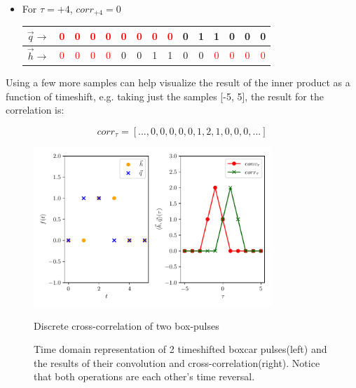 \begin{itemize}
\begin{center}
\end{center}


\item For $\tau = +4$, $corr_{+4}=0$

\begin{center}

\begin{tabular}{c|c|c|c|c| c|c|c|c|c|c |c|c|c|c|}

$\vec{q} \rightarrow$&\textcolor{red}{0}&\textcolor{red}{0}&\textcolor{red}{0}&\textcolor{red}{0}&\textcolor{red}{0}&\textcolor{red}{0}&\textcolor{red}{0}&\textcolor{red}{0}&0&1&1&0&0&0\\

\hline
$\vec{h} \rightarrow$&\textcolor{red}{0}&\textcolor{red}{0}&\textcolor{red}{0}&\textcolor{red}{0}&0&0&1&1&0&0&\textcolor{red}{0}&\textcolor{red}{0}&\textcolor{red}{0}&\textcolor{red}{0}
\end{tabular}

\end{center}

\end{itemize}

\vspace{1cm}

Using a few more samples can help visualize the result of the inner product as a function of timeshift, e.g. taking just the samples [-5, 5], the result for the correlation is:

$$corr_\tau = [...,0,0,0,0,0,1,2,1,0,0,0 ,...]$$



\begin{figure}[hbt!]
\begin{center}
\includegraphics[width=0.8\textwidth, angle=0]{images/Data_analysis/sig_proc/corr.pdf}
\captionsetup{width=0.8\textwidth}
\caption{Discrete cross-correlation of two box-pulses}
\caption*{Time domain representation of 2 timeshifted boxcar pulses(left) and the results of their convolution and cross-correlation(right). Notice that both operations are each other's time reversal.}
\label{fig:3}
\end{center}
\end{figure}


